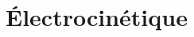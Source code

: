 \documentclass[a4paper, 12pt, garamond]{book}
\begin{document}
\part{Électrocinétique}
% 
% 
% 
% 
% 
% 
% 
% 
% 
% 
% 
% 
% 
% 
% 
% 
% 
% 
% 
% 
% 
% 
% 
% 
% 
% 
% 
% 
% 
% 
% 
% 
% 
% 
% 
% 
% 
% 
\end{document}
